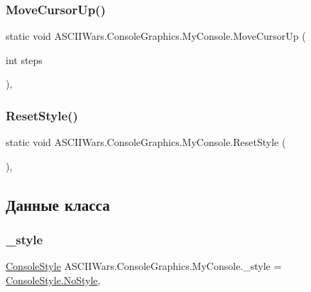 \subsubsection{\texorpdfstring{Move\+Cursor\+Up()}{MoveCursorUp()}}
{\footnotesize\ttfamily static void A\+S\+C\+I\+I\+Wars.\+Console\+Graphics.\+My\+Console.\+Move\+Cursor\+Up (\begin{DoxyParamCaption}\item[{int}]{steps }\end{DoxyParamCaption})\hspace{0.3cm}{\ttfamily [inline]}, {\ttfamily [static]}}

\hypertarget{class_a_s_c_i_i_wars_1_1_console_graphics_1_1_my_console_aaf8beb7ac6983ccf63473d92398173a6}{}\label{class_a_s_c_i_i_wars_1_1_console_graphics_1_1_my_console_aaf8beb7ac6983ccf63473d92398173a6} 
\subsubsection{\texorpdfstring{Reset\+Style()}{ResetStyle()}}
{\footnotesize\ttfamily static void A\+S\+C\+I\+I\+Wars.\+Console\+Graphics.\+My\+Console.\+Reset\+Style (\begin{DoxyParamCaption}{ }\end{DoxyParamCaption})\hspace{0.3cm}{\ttfamily [inline]}, {\ttfamily [static]}}



\subsection{Данные класса}
\hypertarget{class_a_s_c_i_i_wars_1_1_console_graphics_1_1_my_console_a6c024c3a9ff580d84a2260a750af20a4}{}\label{class_a_s_c_i_i_wars_1_1_console_graphics_1_1_my_console_a6c024c3a9ff580d84a2260a750af20a4} 
\subsubsection{\texorpdfstring{\+\_\+style}{\_style}}
{\footnotesize\ttfamily \hyperlink{namespace_a_s_c_i_i_wars_1_1_console_graphics_a9b323f4b2bf48062c9245b24e74b2882}{Console\+Style} A\+S\+C\+I\+I\+Wars.\+Console\+Graphics.\+My\+Console.\+\_\+style = \hyperlink{namespace_a_s_c_i_i_wars_1_1_console_graphics_a9b323f4b2bf48062c9245b24e74b2882aaf0ab25243139e9c44bdbfbde2ce6f1d}{Console\+Style.\+No\+Style}\hspace{0.3cm}{\ttfamily [static]}, {\ttfamily [private]}}

